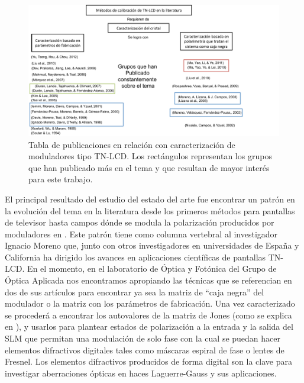 \begin{figure}[h!]
\centering
\includegraphics[scale=.5]{articulos_metodos}
\caption{Tabla de publicaciones en relación con caracterización de
  moduladores tipo TN-LCD. Los rectángulos representan los grupos que
  han publicado más en el tema y que resultan de mayor interés para
  este trabajo. }
\label{fig:articulos_metodos}
\end{figure}

El principal resultado del estudio del estado del arte fue encontrar
un patrón en la evolución del tema en la literatura desde los primeros
métodos para pantallas de televisor  hasta campos
dónde se modula la polarización producidos por moduladores en
. Este patrón tiene como columna vertebral al
investigador Ignacio Moreno que, junto con otros investigadores en
universidades de España y California ha dirigido los avances en aplicaciones
científicas de pantallas TN-LCD. En el momento, en el laboratorio de
Óptica y Fotónica del Grupo de Óptica Aplicada nos encontramos
apropiando las técnicas que se referencian en dos de sus artículos
para encontrar ya sea la matriz de ``caja negra'' del modulador o la
matriz con los parámetros de fabricación. Una vez caracterizado se
procederá a encontrar los autovalores de la matriz de Jones (como se
explica en ), y usarlos
para plantear estados de polarización a la entrada y la salida del SLM
que permitan una modulación de solo fase con la cual se puedan hacer
elementos difractivos digitales tales como máscaras espiral de fase o
lentes de Fresnel. Los elementos difractivos producidos de forma
digital son la clave para investigar aberraciones ópticas en haces
Laguerre-Gauss y sus aplicaciones.

\newpage
\pagebreak[4]
